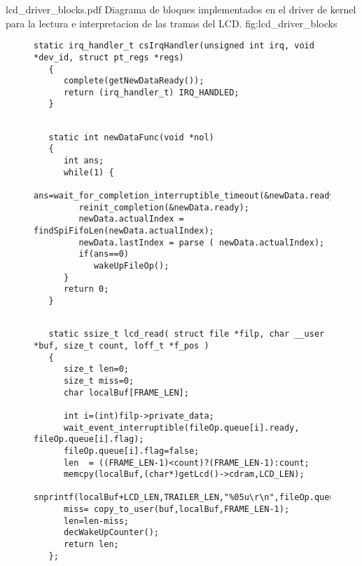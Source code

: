          {lcd_driver_blocks.pdf}
         {Diagrama de bloques implementados en el driver de kernel para la lectura e interpretacion de las tramas del LCD.}
         {fig:lcd_driver_blocks}

\begin{figure}[h]
   \begin{lstlisting}[caption={Manejador de la interrupcion asociada auna transaccion SPI. Cuando es llamada activa toda la cadena de procesos que actualiza el estado de la pantalla.},label={cod:lcd_driver}]
   static irq_handler_t csIrqHandler(unsigned int irq, void *dev_id, struct pt_regs *regs)
   {
      complete(getNewDataReady());
      return (irq_handler_t) IRQ_HANDLED;
   }
   \end{lstlisting}
\end{figure}

\begin{figure}[h]
   \begin{lstlisting}[caption={},label={cod:lcd_driver},title={\lstlistingname~\thelstlisting: Tarea que espera en modo bloqueante una trama nueva. Utiliza uno de los metodos de comunicacion interprocesos del kernel de Linux.}]

   static int newDataFunc(void *nol)
   {
      int ans;
      while(1) {
         ans=wait_for_completion_interruptible_timeout(&newData.ready,msecs_to_jiffies(param_newDataTout));
         reinit_completion(&newData.ready);
         newData.actualIndex = findSpiFifoLen(newData.actualIndex);
         newData.lastIndex = parse ( newData.actualIndex);
         if(ans==0)
            wakeUpFileOp();
      }
      return 0;
   }
   \end{lstlisting}
\end{figure}

\begin{figure}[h]
   \begin{lstlisting}[name={caption},caption={},label=cod:lcd_driver,title={\lstlistingname~\thelstlisting: Funcion que bloquea a la espera de una operacion de lectura del espacio de usuario. Cuando se activa copia el estado de la pantalla.}] 

   static ssize_t lcd_read( struct file *filp, char __user *buf, size_t count, loff_t *f_pos )
   {
      size_t len=0;
      size_t miss=0;
      char localBuf[FRAME_LEN];

      int i=(int)filp->private_data;
      wait_event_interruptible(fileOp.queue[i].ready, fileOp.queue[i].flag);
      fileOp.queue[i].flag=false;
      len  = ((FRAME_LEN-1)<count)?(FRAME_LEN-1):count;
      memcpy(localBuf,(char*)getLcd()->cdram,LCD_LEN);
      snprintf(localBuf+LCD_LEN,TRAILER_LEN,"%05u\r\n",fileOp.queue[i].frameNumber++);
      miss= copy_to_user(buf,localBuf,FRAME_LEN-1);
      len=len-miss;
      decWakeUpCounter();
      return len;
   };
   \end{lstlisting}
\end{figure}

